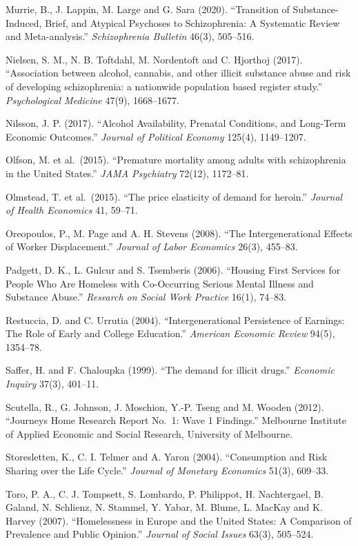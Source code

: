 \documentclass[10pt]{article}
\begin{document}
{\begin{list}{}{\setlength{\leftmargin}{1.5em}\setlength{\itemindent}{-1.5em}\setlength{\itemsep}{0.35em}\setlength{\parsep}{0em}}
\item Murrie, B., J. Lappin, M. Large and G. Sara (2020). ``Transition of Substance-Induced, Brief, and Atypical Psychoses to Schizophrenia: A Systematic Review and Meta-analysis.'' \emph{Schizophrenia Bulletin} 46(3), 505--516.
\item Nielsen, S. M., N. B. Toftdahl, M. Nordentoft and C. Hjorthoj (2017). ``Association between alcohol, cannabis, and other illicit substance abuse and risk of developing schizophrenia: a nationwide population based register study.'' \emph{Psychological Medicine} 47(9), 1668--1677.
\item Nilsson, J. P. (2017). ``Alcohol Availability, Prenatal Conditions, and Long-Term Economic Outcomes.'' \emph{Journal of Political Economy} 125(4), 1149--1207.
\item Olfson, M. et al.\ (2015). ``Premature mortality among adults with schizophrenia in the United States.'' \emph{JAMA Psychiatry} 72(12), 1172--81.
\item Olmstead, T. et al.\ (2015). ``The price elasticity of demand for heroin.'' \emph{Journal of Health Economics} 41, 59--71.
\item Oreopoulos, P., M. Page and A. H. Stevens (2008). ``The Intergenerational Effects of Worker Displacement.'' \emph{Journal of Labor Economics} 26(3), 455--83.
\item Padgett, D. K., L. Gulcur and S. Tsemberis (2006). ``Housing First Services for People Who Are Homeless with Co-Occurring Serious Mental Illness and Substance Abuse.'' \emph{Research on Social Work Practice} 16(1), 74--83.
\item Restuccia, D. and C. Urrutia (2004). ``Intergenerational Persistence of Earnings: The Role of Early and College Education.'' \emph{American Economic Review} 94(5), 1354--78.
\item Saffer, H. and F. Chaloupka (1999). ``The demand for illicit drugs.'' \emph{Economic Inquiry} 37(3), 401--11.
\item Scutella, R., G. Johnson, J. Moschion, Y.-P. Tseng and M. Wooden (2012). ``Journeys Home Research Report No.\ 1: Wave 1 Findings.'' Melbourne Institute of Applied Economic and Social Research, University of Melbourne.
\item Storesletten, K., C. I. Telmer and A. Yaron (2004). ``Consumption and Risk Sharing over the Life Cycle.'' \emph{Journal of Monetary Economics} 51(3), 609--33.
\item Toro, P. A., C. J. Tompsett, S. Lombardo, P. Philippot, H. Nachtergael, B. Galand, N. Schlienz, N. Stammel, Y. Yabar, M. Blume, L. MacKay and K. Harvey (2007). ``Homelessness in Europe and the United States: A Comparison of Prevalence and Public Opinion.'' \emph{Journal of Social Issues} 63(3), 505--524.

\end{list}}
\end{document}
